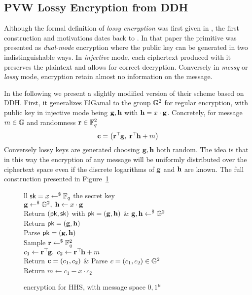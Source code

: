\subsection{PVW Lossy Encryption from DDH}
Although the formal definition of \textit{lossy encryption} was first given in \cite{AC:HLOV11}, the first construction and motivations dates back to \cite{C:PeiVaiWat08}.
In that paper the primitive was presented as \textit{dual-mode} encryption where the public key can be generated in two indistinguishable ways.
In \textit{injective} mode, each ciphertext produced with it preserves the plaintext and allows for correct decryption.
Conversely in \textit{messy} or \textit{lossy} mode, encryption retain almost no information on the message.

In the following we present a slightly modified version of their scheme based on DDH.
First, it generalizes ElGamal to the group $\mathbb{G}^2$ for regular encryption, with public key in injective mode being $\mathbf{g}, \mathbf{h}$ with $\mathbf{h} = x \cdot \mathbf{g}$. Concretely, for message $m \in \mathbb{G}$ and randomness $\mathbf{r} \in \mathbb{F}_q^2$
\[
	\mathbf{c} = \left( \mathbf{r}^\top\hspace{-.1em} \mathbf{g}, \; \mathbf{r}^\top\hspace{-.1em} \mathbf{h} + m \right)
\]
Conversely lossy keys are generated choosing $\mathbf{g}, \mathbf{h}$ both random.
The idea is that in this way the encryption of any message will be uniformly distributed over the ciphertext space even if the discrete logarithms of $\mathbf{g}$ and $\mathbf{h}$ are known.
The full construction presented in Figure~\ref{prot:PVW08}

\begin{figure}[htb]
\centering
\begin{pcarray}{ll}
		{
			$\mathsf{sk} = x \gets^{\$} \mathbb{F}_q$ the secret key
				\\
			$\mathbf{g} \gets^{\$} \mathbb{G}^2, \; \mathbf{h} \gets x \cdot \mathbf{g}$
				\\
			Return $(\mathsf{pk}, \mathsf{sk})$ with $\mathsf{pk} = (\mathbf{g}, \mathbf{h})$	
		}
	&
		{
			$\mathbf{g}, \mathbf{h} \gets^{\$} \mathbb{G}^2$
				\\
			Return $\mathsf{pk} = (\mathbf{g}, \mathbf{h})$
		}
	\\
		{
			Parse $\mathsf{pk} = (\mathbf{g}, \mathbf{h})$
				\\
			Sample $\mathbf{r} \gets^{\$} \mathbb{F}_q^2$
				\\
			$c_1 \gets \mathbf{r}^\top\hspace{-.1em} \mathbf{g}, \; c_2 \gets \mathbf{r}^\top\hspace{-.1em} \mathbf{h} + m$
				\\
			Return $\mathbf{c} = (c_1, c_2)$
		}
	&
		{
			Parse $c = (c_1, c_2) \in \mathbb{G}^2$
				\\
			Return $m \gets c_1 - x \cdot c_2$
		}
\end{pcarray}
\label{prot:PVW08}
\caption{\cite{C:PeiVaiWat08} encryption for HHS, with message space ${0, 1}^\mu$}
\end{figure}

